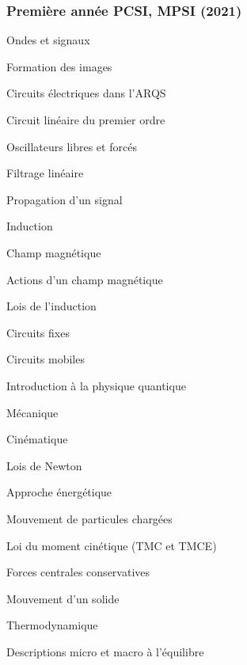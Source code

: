 \subsubsection*{Première année PCSI, MPSI (2021)}
\begin{multicols}{2}
\begin{programme}
    \item Ondes et signaux
    \begin{programme}
        \item Formation des images
        \item Circuits électriques dans l'ARQS
        \item Circuit linéaire du premier ordre
        \item Oscillateurs libres et forcés
        \item Filtrage linéaire
        \item Propagation d'un signal
        \item Induction
        \begin{programme}
        \item Champ magnétique
        \item Actions d'un champ magnétique
        \item Lois de l’induction
        \item Circuits fixes
        \item Circuits mobiles
    \end{programme}
        \item Introduction à la physique quantique
    \end{programme}
    \item Mécanique
    \begin{programme}
        \item Cinématique
        \item Lois de Newton
        \item Approche énergétique
        \item Mouvement de particules chargées
        \item Loi du moment cinétique (TMC et TMCE)
        \item Forces centrales conservatives
        \item Mouvement d'un solide 
    \end{programme}
    \columnbreak
    \item Thermodynamique
    \begin{programme}
        \item Descriptions micro et  macro à l'équilibre

\end{programme}
\end{programme}
\end{multicols}
